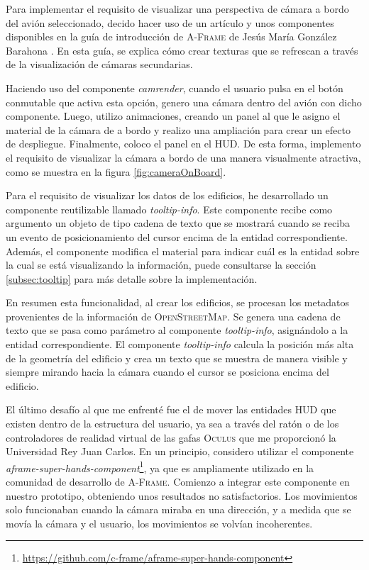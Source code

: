 \documentclass[a4paper, 11pt]{book}
\begin{document}
Para implementar el requisito de visualizar una perspectiva de cámara a bordo del avión seleccionado, decido hacer uso de un artículo y unos componentes disponibles en la guía de introducción de \textsc{A-Frame} de Jesús María González Barahona \cite{aframe_notes}. En esta guía, se explica cómo crear texturas que se refrescan a través de la visualización de cámaras secundarias.

Haciendo uso del componente \emph{camrender}, cuando el usuario pulsa en el botón conmutable que activa esta opción, genero una cámara dentro del avión con dicho componente. Luego, utilizo animaciones, creando un panel al que le asigno el material de la cámara de a bordo y realizo una ampliación para crear un efecto de despliegue. Finalmente, coloco el panel en el \textsc{\gls{HUD}}. De esta forma, implemento el requisito de visualizar la cámara a bordo de una manera visualmente atractiva, como se muestra en la figura \ref{fig:cameraOnBoard}.

Para el requisito de visualizar los datos de los edificios, he desarrollado un componente reutilizable llamado \emph{tooltip-info}. Este componente recibe como argumento un objeto de tipo cadena de texto que se mostrará cuando se reciba un evento de posicionamiento del cursor encima de la entidad correspondiente. Además, el componente modifica el material para indicar cuál es la entidad sobre la cual se está visualizando la información, puede consultarse la sección \ref{subsec:tooltip} para más detalle sobre la implementación.

En resumen esta funcionalidad, al crear los edificios, se procesan los metadatos provenientes de la información de \textsc{OpenStreetMap}. Se genera una cadena de texto que se pasa como parámetro al componente \emph{tooltip-info}, asignándolo a la entidad correspondiente. El componente \emph{tooltip-info} calcula la posición más alta de la geometría del edificio y crea un texto que se muestra de manera visible y siempre mirando hacia la cámara cuando el cursor se posiciona encima del edificio.

El último desafío al que me enfrenté fue el de mover las entidades \textsc{\gls{HUD}} que existen dentro de la estructura del usuario, ya sea a través del ratón o de los controladores de realidad virtual de las gafas \textsc{Oculus} que me proporcionó la Universidad Rey Juan Carlos. En un principio, considero utilizar el componente \emph{aframe-super-hands-component}\footnote{\url{https://github.com/c-frame/aframe-super-hands-component}}, ya que es ampliamente utilizado en la comunidad de desarrollo de \textsc{A-Frame}. Comienzo a integrar este componente en nuestro prototipo, obteniendo unos resultados no satisfactorios. Los movimientos solo funcionaban cuando la cámara miraba en una dirección, y a medida que se movía la cámara y el usuario, los movimientos se volvían incoherentes.
\end{document}
